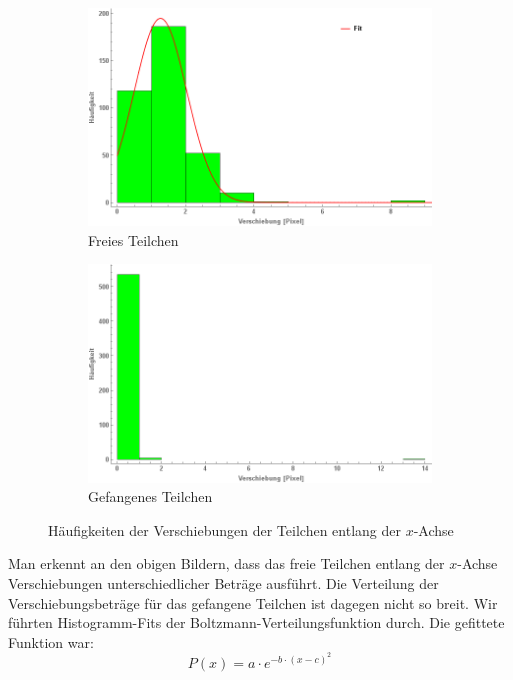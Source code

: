 \documentclass[a4paper,titlepage]{scrartcl}
\numberwithin{equation}{section}
\begin{document}
\begin{figure}[H]
\centering
\begin{subfigure}{.5\textwidth}
  \centering
  \includegraphics[width=.95\linewidth]{images/frei-x-dms.png}
  \caption{Freies Teilchen}
  \label{fig:dmsxfrei}
\end{subfigure}%
\begin{subfigure}{.5\textwidth}
  \centering
  \includegraphics[width=.95\linewidth]{images/fest-x-dms.png}
  \caption{Gefangenes Teilchen}
  \label{fig:dmsxfest}
\end{subfigure}
\caption{Häufigkeiten der Verschiebungen der Teilchen entlang der $x$-Achse}
\label{fig:dmsx}
\end{figure}
Man erkennt an den obigen Bildern, dass das freie Teilchen entlang der $x$-Achse Verschiebungen unterschiedlicher Beträge ausführt. Die Verteilung der Verschiebungsbeträge für das gefangene Teilchen ist dagegen nicht so breit. Wir führten Histogramm-Fits der Boltzmann-Verteilungsfunktion durch. Die gefittete Funktion war:
\begin{equation}
\label{eq:fitfn}
P(x)=a \cdot e^{-b \cdot (x-c)^2}
\end{equation}
\end{document}

